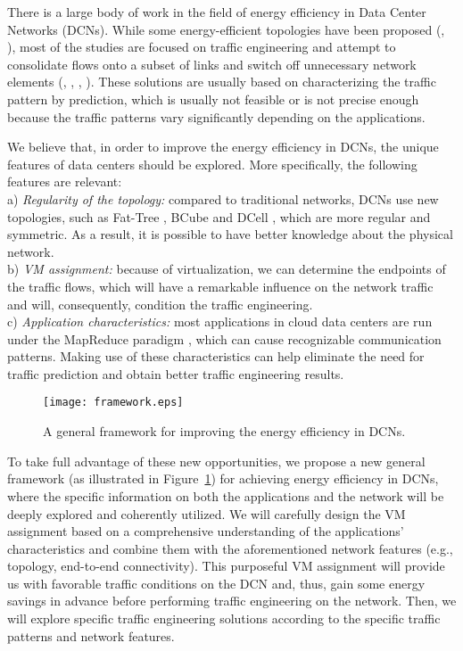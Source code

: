 \documentclass[journal,single-space,two column,twoside,10pt]{IEEEtran}
\begin{document}
There is a large body of work in the field of energy efficiency in Data Center Networks (DCNs). While some energy-efficient topologies have been proposed (\cite{Abts_Marty-2010}, \cite{Huang_Jia-2011}), most of the studies are focused on traffic engineering and attempt to consolidate flows onto a subset of links and switch off unnecessary network elements (\cite{Wang_Yao-2012}, \cite{Heller_Seetharaman-2010}, \cite{Shang_Li-2010}, \cite{Zhang_Ansari-2012}). These solutions are usually based on characterizing the traffic pattern by prediction, which is usually not feasible or is not precise enough because the traffic patterns vary significantly depending on the applications.

We believe that, in order to improve the energy efficiency in DCNs, the unique features of data centers should be explored. More specifically, the following features are relevant: \\
a) \textit{Regularity of the topology:} compared to traditional networks, DCNs use new topologies, such as Fat-Tree \cite{Al-Fares_Loukissas-2008}, BCube \cite{Guo_Lu-2009} and DCell \cite{Guo_Wu-2008}, which are more regular and symmetric. As a result, it is possible to have better knowledge about the physical network.\\
b) \textit{VM assignment:} because of virtualization, we can determine the endpoints of the traffic flows, which will have a remarkable influence on the network traffic and will, consequently, condition the traffic engineering.\\
c) \textit{Application characteristics:}  most applications in cloud data centers are run under the MapReduce paradigm \cite{Dean_Chemawat-2008}, which can cause recognizable communication patterns. Making use of these characteristics can help eliminate the need for traffic prediction and obtain better traffic engineering results.

\begin{figure}
\centering
	\texttt{[image: framework.eps]}
   \caption{\label{fig:framework}A general framework for improving the energy efficiency in DCNs.}
	\vspace{-0.6cm}
\end{figure}



To take full advantage of these new opportunities, we propose a new general framework (as illustrated in Figure~\ref{fig:framework}) for achieving energy efficiency in DCNs, where the specific information on both the applications and the network will be deeply explored and coherently utilized. 
We will carefully design the VM assignment based on a comprehensive understanding of the applications' characteristics and combine them with the aforementioned network features (e.g., topology, end-to-end connectivity). This purposeful VM assignment will provide us with favorable traffic conditions on the DCN and, thus, gain some energy savings in advance before performing traffic engineering on the network. Then, we will explore specific traffic engineering solutions according to the specific traffic patterns and network features.
\end{document}
